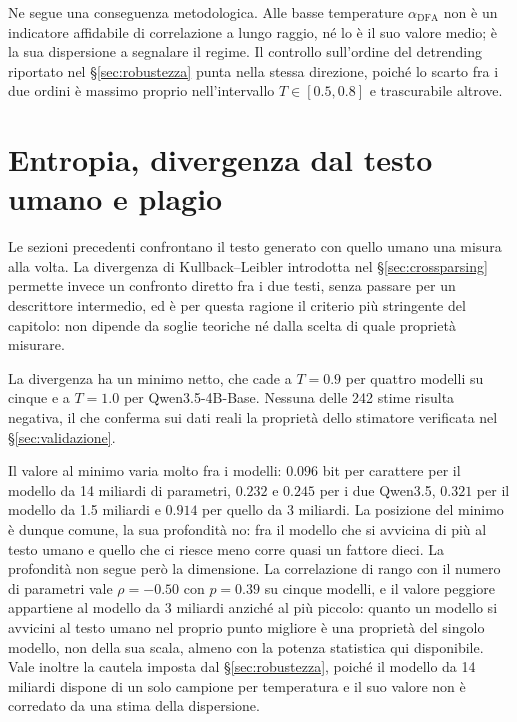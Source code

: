 Ne segue una conseguenza metodologica. Alle basse temperature
$\alpha_{\mathrm{DFA}}$ non è un indicatore affidabile di correlazione a lungo
raggio, né lo è il suo valore medio; è la sua dispersione a segnalare il regime.
Il controllo sull'ordine del detrending riportato nel §\ref{sec:robustezza}
punta nella stessa direzione, poiché lo scarto fra i due ordini è massimo
proprio nell'intervallo $T \in [0.5, 0.8]$ e trascurabile altrove.

\section{Entropia, divergenza dal testo umano e plagio}
\label{sec:entropia-risultati}

Le sezioni precedenti confrontano il testo generato con quello umano una misura
alla volta. La divergenza di Kullback--Leibler introdotta nel
§\ref{sec:crossparsing} permette invece un confronto diretto fra i due testi,
senza passare per un descrittore intermedio, ed è per questa ragione il criterio
più stringente del capitolo: non dipende da soglie teoriche né dalla scelta di
quale proprietà misurare.


La divergenza ha un minimo netto, che cade a $T = 0.9$ per quattro modelli su
cinque e a $T = 1.0$ per Qwen3.5-4B-Base. Nessuna delle \num{242} stime risulta
negativa, il che conferma sui dati reali la proprietà dello stimatore verificata
nel §\ref{sec:validazione}.

Il valore al minimo varia molto fra i modelli: $0.096$ bit per carattere per il
modello da 14 miliardi di parametri, $0.232$ e $0.245$ per i due Qwen3.5,
$0.321$ per il modello da 1.5 miliardi e $0.914$ per quello da 3 miliardi. La
posizione del minimo è dunque comune, la sua profondità no: fra il modello che
si avvicina di più al testo umano e quello che ci riesce meno corre quasi un
fattore dieci. La profondità non segue però la dimensione. La correlazione di
rango con il numero di parametri vale $\rho = -0.50$ con $p = 0.39$ su cinque
modelli, e il valore peggiore appartiene al modello da 3 miliardi anziché al più
piccolo: quanto un modello si avvicini al testo umano nel proprio punto migliore
è una proprietà del singolo modello, non della sua scala, almeno con la potenza
statistica qui disponibile. Vale inoltre la cautela imposta dal
§\ref{sec:robustezza}, poiché il modello da 14 miliardi dispone di un solo
campione per temperatura e il suo valore non è corredato da una stima della
dispersione.

